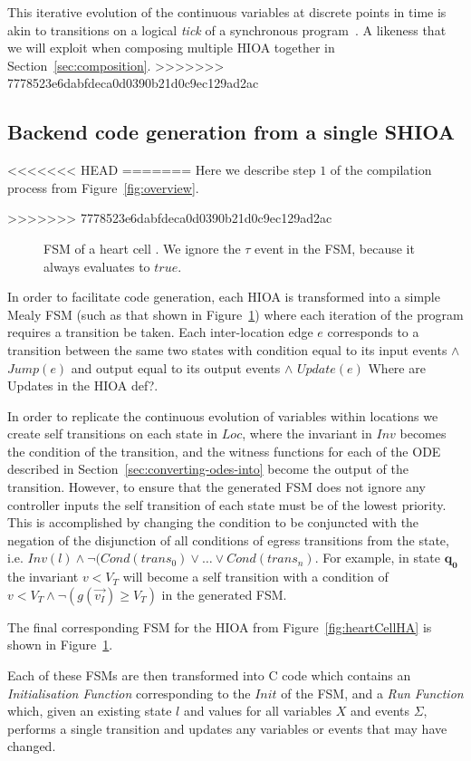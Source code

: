 This iterative evolution of the continuous variables at discrete points
in time is akin to transitions on a logical \emph{tick} of a
synchronous program~\cite{benveniste03}. A likeness that we will exploit when 
composing multiple \ac{HIOA} together in Section~\ref{sec:composition}.
>>>>>>> 7778523e6dabfdeca0d0390b21d0c9ec129ad2ac

\subsection{Backend code generation from a single \ac{SHIOA}}
\label{sec:backendCodeGeneration}

<<<<<<< HEAD
=======
Here we describe step $1$ of the compilation process from 
Figure~\ref{fig:overview}.

>>>>>>> 7778523e6dabfdeca0d0390b21d0c9ec129ad2ac
\begin{figure}
  \centering
  
  \caption{\acf{FSM} of a heart cell \label{fig:heartCellFSM}. We ignore
    the $\tau$ event in the \ac{FSM}, because it always evaluates to $true$.}
\end{figure}

In order to facilitate code generation, each \ac{HIOA} is transformed into a 
simple Mealy \ac{FSM} (such as that shown in Figure~\ref{fig:heartCellFSM}) 
where each iteration of the program requires a transition be taken.  Each 
inter-location edge $e$ corresponds to a transition between the same two states 
with condition equal to its input events $\wedge$ $Jump(e)$ and output equal to 
its output events $\wedge$ $Update(e)$ {\color{red} Where are Updates in the 
HIOA def?}.

In order to replicate the continuous evolution of variables within locations we 
create self transitions on each state in $Loc$, where the invariant in $Inv$ 
becomes the condition of the transition, and the witness functions for each of 
the \acs{ODE} described in Section~\ref{sec:converting-odes-into} become the 
output of the transition. However, to ensure that the generated \ac{FSM} does 
not ignore any controller inputs the self transition of each state must be of 
the lowest priority.  This is accomplished by changing the condition to be 
conjuncted with the negation of the disjunction of all conditions of egress 
transitions from the state, i.e. $Inv(l) \wedge \neg (Cond(trans_{0}) \vee 
\dots \vee Cond(trans_{n})$.  For example, in state $\mathbf{q_0}$ the 
invariant $v < V_{T}$ will become a self transition with a condition of $v < 
V_{T} \wedge \neg (g(\vec{v_{I}}) \geq V_{T})$ in the generated \ac{FSM}.

The final corresponding \ac{FSM} for the \ac{HIOA} from 
Figure~\ref{fig:heartCellHA} is shown in Figure~\ref{fig:heartCellFSM}.

Each of these \acp{FSM} are then transformed into C code which contains an 
\emph{Initialisation Function} corresponding to the $Init$ of the \ac{FSM}, and 
a \emph{Run Function} which, given an existing state $l$ and values for all 
variables $X$ and events $\Sigma$, performs a single transition and updates any 
variables or events that may have changed.
